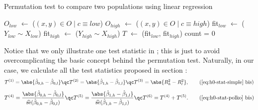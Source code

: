 \IncMargin{1em}
\begin{algorithm}[H]
	\caption{Permutation test to compare two populations using linear regression}
	\label{alg:perm-test}
	\DontPrintSemicolon
		$O_{low}$ $\gets$ \SubSet($(x,y) \in O \mid c \equiv low$)\;
		$O_{high}$ $\gets$ \SubSet($(x,y) \in O \mid c \equiv high$)
		fit$_{low}$ $\gets$ \LinearModel($Y_{low} \sim X_{low}$) \;
		fit$_{high}$ $\gets$ \LinearModel($Y_{high} \sim X_{high}$)\;
		$T$ $\gets$ \GetStatistic(fit$_{low}$, fit$_{high}$) \;
		count = 0 \;
		 \;
\end{algorithm}
\DecMargin{1em}


Notice that we only illustrate one test statistic in ; this is just to avoid overcomplicating the basic concept behind the permutation test. Naturally, in our case, we calculate all the test statistics proposed in section :
\begin{align}
	T^{(1)} = \abs{\hat{\beta}_{0,h} - \hat{\beta}_{0,l}}
	\qc
	T^{(2)} = \abs{\hat{\beta}_{1,h} - \hat{\beta}_{1,l}}
	\qc
	T^{(3)} = \abs{ R^{2}_{h} - R^{2}_{l} }, \tag{\ref{eq:h0-stat-simple} bis}
\end{align}
\begin{align}
	T^{(4)} = \frac{\abs{\hat{\beta}_{0,h} - \hat{\beta}_{0,l}}}{\se{\hat{\beta}_{0,h} - \hat{\beta}_{0,l}}}
	\qc
	T^{(5)} = \frac{\abs{\hat{\beta}_{1,h} - \hat{\beta}_{1,l}}}{\se{\hat{\beta}_{1,h} - \hat{\beta}_{1,l}}}
	\qc
	T^{(6)} = T^{(4)} + T^{(5)} .
	\tag{\ref{eq:h0-stat-polko} bis}
\end{align}

